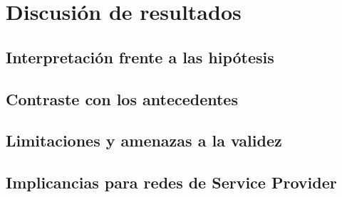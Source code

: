 
\section{Discusión de resultados}
\label{sec:discusion}

\subsection{Interpretación frente a las hipótesis}
\label{subsec:disc_hipotesis}

\subsection{Contraste con los antecedentes}
\label{subsec:disc_antecedentes}

\subsection{Limitaciones y amenazas a la validez}
\label{subsec:disc_limitaciones}

\subsection{Implicancias para redes de Service Provider}
\label{subsec:disc_implicancias}
